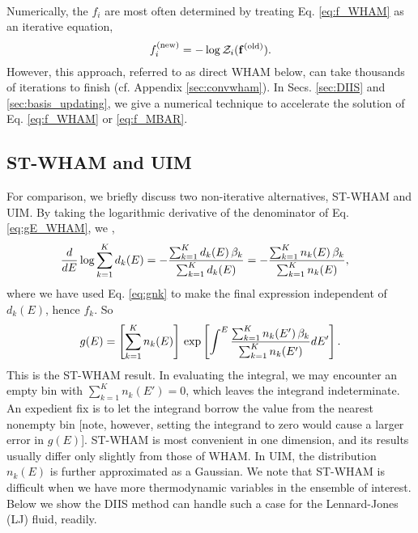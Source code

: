 \documentclass[aip,jcp,preprint,superscriptaddress]{revtex4-1}
\begin{document}
\paragraph*{}



Numerically, the
$f_i$ are most often determined by treating Eq. \eqref{eq:f_WHAM}
as an iterative equation,
%
\begin{equation*}
f_i^\mathrm{(new)}
=
-\log \mathcal{Z}_i( \mathbf{f}^\mathrm{(old)} ).
\end{equation*}
%
However, this approach, referred to as direct WHAM below,
can take thousands of iterations to finish\cite{
bereau2009, kim2011, zhu2012}
(cf. Appendix \ref{sec:convwham}).
%
In Secs. \ref{sec:DIIS} and \ref{sec:basis_updating},
we give a numerical technique to
accelerate the solution
of Eq. \eqref{eq:f_WHAM} or \eqref{eq:f_MBAR}.





\subsection{ST-WHAM and UIM}



For comparison,
we briefly discuss
two non-iterative alternatives, ST-WHAM\cite{
fenwick2008, kim2011}
and UIM\cite{
kastner2005, *kastner2009}.
%
By taking the logarithmic derivative of
the denominator of Eq. \eqref{eq:gE_WHAM},
we ,
%
\begin{align}
\frac{d}{dE}
\log
  \sum_{k = 1}^K d_k(E)
&=
-
\frac{
  \sum_{k = 1}^K d_k(E) \, \beta_k
}
{
  \sum_{k = 1}^K d_k(E)
}
=
-
\frac{
  \sum_{k = 1}^K n_k(E) \, \beta_k
}
{
  \sum_{k = 1}^K n_k(E)
},
\notag
\end{align}
%
{
where
we have used Eq. \eqref{eq:gnk}
to make the final expression
independent of $d_k(E)$, hence $f_k$.
}
%
So
\begin{align}
g(E)
=
\left[
  \sum_{k = 1}^K n_k(E)
\right]
\,
\exp
\left[
\int^E
    \frac{ \sum_{k = 1}^K n_k(E') \, \beta_k }
         { \sum_{k = 1}^K n_k(E') }
  dE'
\right].
\notag
\end{align}
%
This is the ST-WHAM result.
%
In evaluating the integral,
we may encounter an empty bin
with $\sum_{k = 1}^K n_k(E') = 0$,
which leaves the integrand indeterminate.
%
An expedient fix is to let the integrand borrow
the value from the nearest nonempty bin
%
[note, however, setting the integrand to zero
would cause a larger error in $g(E)$].
%
ST-WHAM is most convenient in one dimension,
and its results usually differ only slightly
from those of WHAM\cite{kim2011}.
%
In UIM\cite{
kastner2005, *kastner2009},
the distribution $n_k(E)$
is further approximated as a Gaussian.
%
We note that ST-WHAM is difficult when we have more
thermodynamic variables in the ensemble of interest.
%
Below we show  the DIIS method can
handle such a case
for the Lennard-Jones (LJ) fluid, readily.
\end{document}

